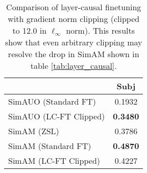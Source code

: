 \begin{table*}[th]
	\centering
	\setlength{\tabcolsep}{7pt}
		\begin{tabular}{l | c}
		\toprule
		& \textbf{Subj} \\
		\midrule
		 SimAUO (Standard FT)     & 0.1932 \\
		 SimAUO (LC-FT Clipped)   & \textbf{0.3480}  \\
		\midrule
		 SimAM (ZSL)                     & 0.3786 \\
		 SimAM (Standard FT)             & \textbf{0.4870} \\
		 SimAM (LC-FT Clipped)           & 0.4227 \\
		
		\end{tabular}
	\caption{
		Comparison of layer-causal finetuning with gradient norm clipping (clipped to 12.0 in $\ell_\infty$ norm).
		This results show that even arbitrary clipping may resolve the drop in SimAM shown in table \ref{tab:layer_causal}.
	}
	\label{tab:per_layer_clipping_metrics}
\end{table*}